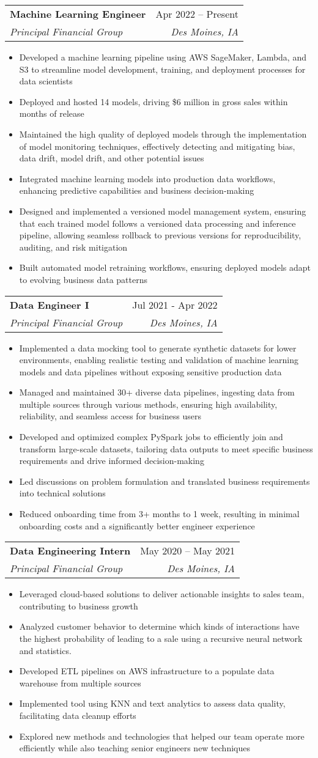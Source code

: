 \documentclass[letterpaper,11pt]{article}
\makeatletter
\newcommand{\resumeItem}[1]{
  \item\small{
    {#1 \vspace{-2pt}}
  }
}
\newcommand{\resumeSubheading}[4]{
  \vspace{-2pt}\item
    \begin{tabular*}{0.97\textwidth}[t]{l@{\extracolsep{\fill}}r}
      \textbf{#1} & #2 \\
      \textit{\small#3} & \textit{\small #4} \\
    \end{tabular*}\vspace{-7pt}
}
\newcommand{\resumeItemListStart}{\begin{itemize}}
\newcommand{\resumeItemListEnd}{\end{itemize}\vspace{-5pt}}
\makeatother
\begin{document}
    \resumeSubheading
      {Machine Learning Engineer}{Apr 2022 -- Present}
      {Principal Financial Group}{Des Moines, IA}
      \resumeItemListStart
	\resumeItem{Developed a machine learning pipeline using AWS SageMaker, Lambda, and S3 to streamline model development, training, and deployment processes for data scientists}
	\resumeItem{Deployed and hosted 14 models, driving \$6 million in gross sales within months of release}
	\resumeItem{Maintained the high quality of deployed models through the implementation of model monitoring techniques, effectively detecting and mitigating bias, data drift, model drift, and other potential issues}
	\resumeItem{Integrated machine learning models into production data workflows, enhancing predictive capabilities and business decision-making}
	\resumeItem{Designed and implemented a versioned model management system, ensuring that each trained model follows a versioned data processing and inference pipeline, allowing seamless rollback to previous versions for reproducibility, auditing, and risk mitigation}
	\resumeItem{Built automated model retraining workflows, ensuring deployed models adapt to evolving business data patterns}
      \resumeItemListEnd
      
    \resumeSubheading
	{Data Engineer I}{Jul 2021 - Apr 2022}
	{Principal Financial Group}{Des Moines, IA}
      \resumeItemListStart
	\resumeItem{Implemented a data mocking tool to generate synthetic datasets for lower environments, enabling realistic testing and validation of machine learning models and data pipelines without exposing sensitive production data}
	\resumeItem{Managed and maintained 30+ diverse data pipelines, ingesting data from multiple sources through various methods, ensuring high availability, reliability, and seamless access for business users}
	\resumeItem{Developed and optimized complex PySpark jobs to efficiently join and transform large-scale datasets, tailoring data outputs to meet specific business requirements and drive informed decision-making}
	\resumeItem{Led discussions on problem formulation and translated business requirements into technical solutions}
	\resumeItem{Reduced onboarding time from 3+ months to 1 week, resulting in minimal onboarding costs and a significantly better engineer experience}
    \resumeItemListEnd

    \resumeSubheading
	{Data Engineering Intern}{May 2020 -- May 2021}
	{Principal Financial Group}{Des Moines, IA}
      \resumeItemListStart
	\resumeItem{Leveraged cloud-based solutions to deliver actionable insights to sales team, contributing to business growth}
	\resumeItem{Analyzed customer behavior to determine which kinds of interactions have the highest probability of leading to a sale using a recursive neural network and statistics.}
	\resumeItem{Developed ETL pipelines on AWS infrastructure to a populate data warehouse from multiple sources}
	\resumeItem{Implemented tool using KNN and text analytics to assess data quality, facilitating data cleanup efforts}
	\resumeItem{Explored new methods and technologies that helped our team operate more efficiently while also teaching senior engineers new techniques}
      \resumeItemListEnd
\end{document}

